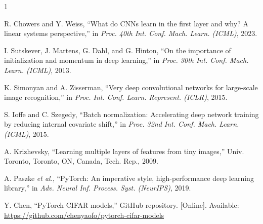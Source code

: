 \documentclass[conference]{IEEEtran}
\begin{document}
\begin{thebibliography}{1}

R. Chowers and Y. Weiss, ``What do CNNs learn in the first layer and why? A
linear systems perspective,'' in \emph{Proc. 40th Int. Conf. Mach. Learn.
(ICML)}, 2023.

I. Sutskever, J. Martens, G. Dahl, and G. Hinton, ``On the importance of
initialization and momentum in deep learning,'' in \emph{Proc. 30th Int. Conf.
Mach. Learn. (ICML)}, 2013.

K. Simonyan and A. Zisserman, ``Very deep convolutional networks for
large-scale image recognition,'' in \emph{Proc. Int. Conf. Learn. Represent.
(ICLR)}, 2015.

S. Ioffe and C. Szegedy, ``Batch normalization: Accelerating deep network
training by reducing internal covariate shift,'' in \emph{Proc. 32nd Int. Conf.
Mach. Learn. (ICML)}, 2015.

A. Krizhevsky, ``Learning multiple layers of features from tiny images,''
Univ. Toronto, Toronto, ON, Canada, Tech. Rep., 2009.

A. Paszke \emph{et al.}, ``PyTorch: An imperative style, high-performance deep
learning library,'' in \emph{Adv. Neural Inf. Process. Syst. (NeurIPS)}, 2019.

Y. Chen, ``PyTorch CIFAR models,'' GitHub repository. [Online]. Available:
\url{https://github.com/chenyaofo/pytorch-cifar-models}

\end{thebibliography}
\end{document}
